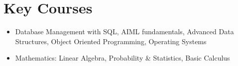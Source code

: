 \documentclass[a4paper,11pt]{article}
\begin{document}
\section*{Key Courses}
\vspace{-2mm}
\begin{itemize}[label=\textbullet, left=0pt, itemsep=0pt,parsep=0pt,topsep=0pt,partopsep=0pt]
    \item Database Management with SQL, AIML fundamentals, Advanced Data Structures, Object Oriented Programming, Operating Systems
    \item Mathematics: Linear Algebra, Probability \& Statistics, Basic Calculus
\end{itemize}
\vspace{-3mm}
\end{document}

